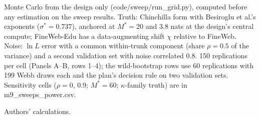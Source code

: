 \begin{table}[tp]
\begin{tablenotes}
Monte Carlo from the design only (code/sweep/run\_grid.py), computed before any estimation on the sweep results. Truth: Chinchilla form with Besiroglu et al.'s exponents ($\sigma^*=0.737$), anchored at $M^*=20$ and 3.8 nats at the design's central compute; FineWeb-Edu has a data-augmenting shift $\chi$ relative to FineWeb. Noise: $\ln L$ error with a common within-trunk component (share $\rho=0.5$ of the variance) and a second validation set with noise correlated 0.8. 150 replications per cell (Panels A--B, rows 1--4); the wild-bootstrap rows use 60 replications with 199 Webb draws each and the plan's decision rule on two validation sets. Sensitivity cells ($\rho=0$, 0.9; $M^*=60$; $\kappa$-family truth) are in m9\_sweeps\_power.csv.
\end{tablenotes}

\begin{tablenotes}[Source]
Authors' calculations.
\end{tablenotes}
\end{table}

